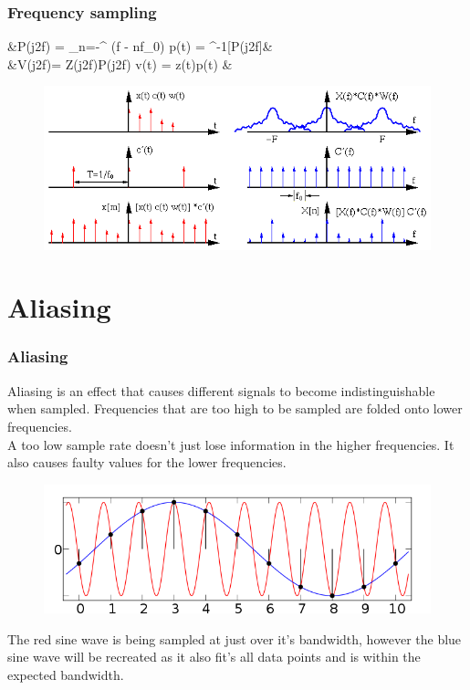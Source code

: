 \begin{frame}
	\frametitle{Frequency sampling}
	\vspace{-4ex}
	\begin{flalign*} 
	&P(j2\pi f) = \sum_{n=-\infty}^{\infty} \delta(f - nf_0) \qquad \leftrightarrow \qquad p(t) = ^{-1}[P(j2\pi f]&\\
	&V(j2\pi f)= Z(j2\pi f)P(j2\pi f) \qquad \leftrightarrow \qquad v(t) = z(t)p(t) &
	\end{flalign*}
	\begin{figure}
		\includegraphics[width=1\linewidth]{frequency_sampling}
	\end{figure}
\end{frame}

\section{Aliasing}

\begin{frame}
	\frametitle{Aliasing}
	Aliasing is	an effect that causes different signals to become indistinguishable when sampled. Frequencies that are too high to be sampled are folded onto lower frequencies.\\
	A too low sample rate doesn't just lose information in the higher frequencies. It also causes faulty values for the lower frequencies.\\
	\vspace{-2ex}
	\begin{figure}
		\includegraphics[width=0.7\linewidth]{aliasing}
	\end{figure}
	\vspace{-2ex}
	The red sine wave is being sampled at just over it's bandwidth, however the blue sine wave will be recreated as it also fit's all data points and is within the expected bandwidth.
\end{frame}

